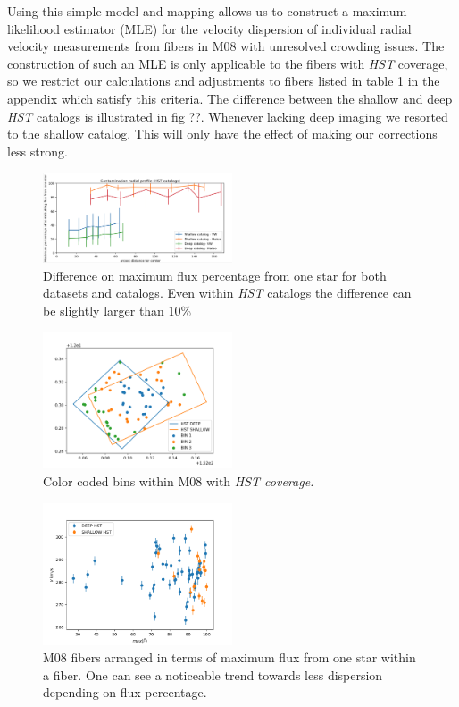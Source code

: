 \documentclass[%
 aip,
 twocolumn,
 jmp,%
 amsmath,amssymb,
 reprint,%
]{aastex61}
\begin{document}
Using this simple model and mapping allows us to construct a maximum likelihood
estimator (MLE) for the velocity dispersion of individual radial velocity measurements
from fibers in M08 with unresolved crowding issues.  The construction of such an MLE
is only applicable to the fibers with {\it HST} coverage, so 
we restrict our calculations and adjustments to fibers listed in table 1 in the appendix 
which satisfy this criteria. The difference between the shallow and deep {\it HST} catalogs 
is illustrated in fig ??. Whenever lacking deep imaging we resorted to the shallow catalog.
This will only have the effect of making our corrections less strong.
\begin{figure}
\centering
\includegraphics[width=0.5\textwidth]{CROWDING/RADIAL_CONTAMINATION.png}
\caption{Difference on maximum flux percentage from one star for both datasets and catalogs. Even
within {\it HST} catalogs the difference can be slightly larger than 10\%}       
\end{figure}
\begin{figure}
\centering
\includegraphics[width=0.5\textwidth]{CROWDING/CROWDING_HSTCOVERAGE.png}
\caption{Color coded bins within M08 with \it{HST} coverage.}       
\end{figure}

\begin{figure}
\centering
\includegraphics[width=0.5\textwidth]{CROWDING/VELvsCROWDING_MATEO.png}
\caption{M08 fibers arranged in terms of maximum flux from one star within a fiber. One can see a noticeable trend towards less dispersion depending on flux percentage.}       
\end{figure}
\end{document}

